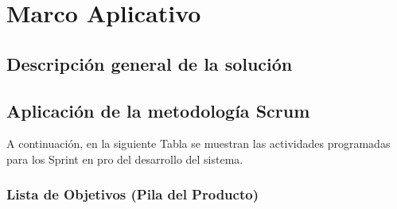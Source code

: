 \chapter{Marco Aplicativo}


\section{Descripción general de la solución} 
\setlength{\parskip}{5mm}
\setlength{\parskip}{0mm}

\newpage

\section{Aplicación de la metodología Scrum}

A continuación, en la siguiente Tabla se muestran las actividades programadas para los Sprint en pro del desarrollo del sistema. 
\subsection{Lista de Objetivos (Pila del Producto)}

